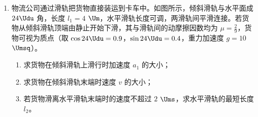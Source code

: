 \documentclass[\gkver]{gaokaozhenti}
\begin{document}
\begin{enumerate}
{	（2）据题意可知：电流表主要部件是永久磁铁和带有指针的线圈，G$_{1}$ 和 G$_{2}$ 用导线连接起来。当晃动 G$_{1}$ 时，相当于 G$_{1}$ 中的线圈做切割磁感线运动，电路中会产生感应电流；由于两个电表构成了闭合电路，则电流会通过 G$_{2}$ 表中的线圈，而该线圈处于磁场中，由于通电导线在磁场中受力的作用，G$_{2}$ 的指针也会偏转；则 G$_{1}$ 表相当于“发电机”，G$_{2}$ 表相当于“电动机”，故 AC 错误，BD 正确。

	故选 BD。
}

\item
物流公司通过滑轨把货物直接装运到卡车中。如图所示，倾斜滑轨与水平面成 $24\Udu$ 角，长度 $l_{1} = 4$ $\Um$，水平滑轨长度可调，两滑轨间平滑连接。若货物从倾斜滑轨顶端由静止开始下滑，其与滑轨间的动摩擦因数均为 $\mu = \frac{2}{9}$，货物可视为质点（取 $\cos24\Udu = 0.9$，$\sin24\Udu = 0.4$，重力加速度 $g = 10$ $\Umsq$）。
\begin{enumerate}
	\item
	求货物在倾斜滑轨上滑行时加速度 $a_{1}$ 的大小；
	\item
	求货物在倾斜滑轨末端时速度 $v$ 的大小；
	\item
	若货物滑离水平滑轨末端时的速度不超过 $2$ $\Ums$，求水平滑轨的最短长度 $l_{2}$。
\end{enumerate}

\end{enumerate}
\end{document}
